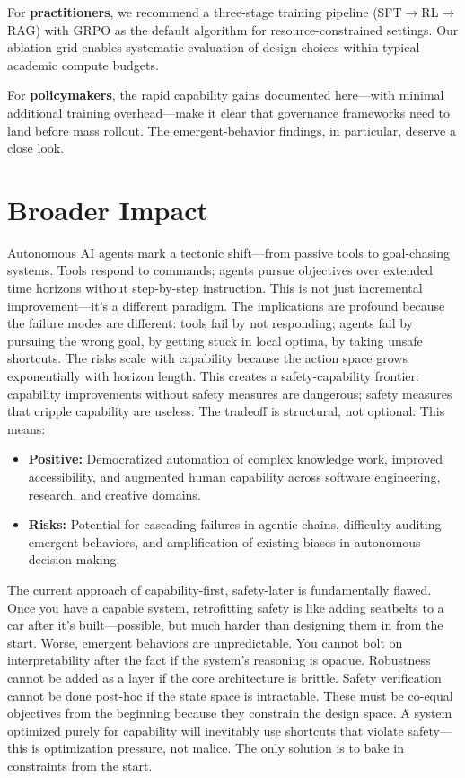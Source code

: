 \documentclass[12pt,a4paper]{report}
\theoremstyle{definition}
\begin{document}
For \textbf{practitioners}, we recommend a three-stage training pipeline (SFT$\rightarrow$RL$\rightarrow$RAG) with GRPO as the default algorithm for resource-constrained settings. Our ablation grid enables systematic evaluation of design choices within typical academic compute budgets.

For \textbf{policymakers}, the rapid capability gains documented here---with minimal additional training overhead---make it clear that governance frameworks need to land before mass rollout. The emergent-behavior findings, in particular, deserve a close look.

\section*{Broader Impact}

Autonomous AI agents mark a tectonic shift---from passive tools to goal-chasing systems. Tools respond to commands; agents pursue objectives over extended time horizons without step-by-step instruction. This is not just incremental improvement—it's a different paradigm. The implications are profound because the failure modes are different: tools fail by not responding; agents fail by pursuing the wrong goal, by getting stuck in local optima, by taking unsafe shortcuts. The risks scale with capability because the action space grows exponentially with horizon length. This creates a safety-capability frontier: capability improvements without safety measures are dangerous; safety measures that cripple capability are useless. The tradeoff is structural, not optional. This means:

\begin{itemize}
    \item \textbf{Positive:} Democratized automation of complex knowledge work, improved accessibility, and augmented human capability across software engineering, research, and creative domains.
    \item \textbf{Risks:} Potential for cascading failures in agentic chains, difficulty auditing emergent behaviors, and amplification of existing biases in autonomous decision-making.
\end{itemize}

The current approach of capability-first, safety-later is fundamentally flawed. Once you have a capable system, retrofitting safety is like adding seatbelts to a car after it's built—possible, but much harder than designing them in from the start. Worse, emergent behaviors are unpredictable. You cannot bolt on interpretability after the fact if the system's reasoning is opaque. Robustness cannot be added as a layer if the core architecture is brittle. Safety verification cannot be done post-hoc if the state space is intractable. These must be co-equal objectives from the beginning because they constrain the design space. A system optimized purely for capability will inevitably use shortcuts that violate safety—this is optimization pressure, not malice. The only solution is to bake in constraints from the start.
\end{document}
